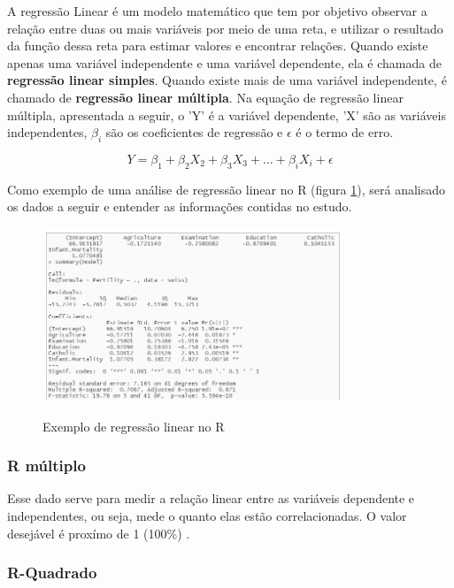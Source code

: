A regressão Linear é um modelo matemático que tem por objetivo observar a relação entre duas ou mais variáveis por meio de uma reta, e utilizar o resultado da função dessa reta para estimar valores e encontrar relações. Quando existe apenas uma variável independente e uma variável dependente, ela é chamada de \textbf{regressão linear simples}. Quando existe mais de uma variável independente, é chamado de \textbf{regressão linear múltipla}. Na equação de regressão linear múltipla, apresentada a seguir, o 'Y' é a variável dependente, 'X' são as variáveis independentes, $\beta_i$ são os coeficientes de regressão e $\epsilon$ é o termo de erro\cite{5}. 

\begin{equation}
    Y = \beta_1 + \beta_2X_2 + \beta_3X_3 + ... + \beta_iX_i + \epsilon    
\end{equation}

Como exemplo de uma análise de regressão linear no R (figura \ref*{fig:R}), será analisado os dados a seguir e entender as informações contidas no estudo.
 
\begin{figure}[h]

    \caption{Exemplo de regressão linear no R \cite{5}}
    \centering
    \includegraphics[width=0.8\textwidth]{fig/R.png}
    \label{fig:R}
    
\end{figure}

\subsubsection*{R múltiplo}

Esse dado serve para medir a relação linear entre as variáveis dependente e independentes, ou seja, mede o quanto elas estão correlacionadas. O valor desejável é proxímo de 1 (100\%) \cite{5}.

\subsubsection*{R-Quadrado}

